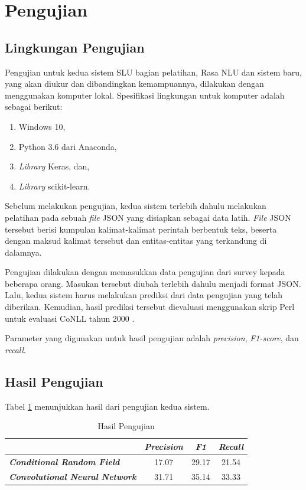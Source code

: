 \section{Pengujian}

\subsection{Lingkungan Pengujian}

Pengujian untuk kedua sistem SLU bagian pelatihan, Rasa NLU dan sistem baru, yang akan diukur dan dibandingkan kemampuannya, dilakukan dengan menggunakan komputer lokal. Spesifikasi lingkungan untuk komputer adalah sebagai berikut:

\begin{enumerate}
    \item Windows 10,
    \item Python 3.6 dari Anaconda,
    \item \textit{Library} Keras, dan,
    \item \textit{Library} scikit-learn.
\end{enumerate}

Sebelum melakukan pengujian, kedua sistem terlebih dahulu melakukan pelatihan pada sebuah \textit{file} JSON yang disiapkan sebagai data latih. \textit{File} JSON tersebut berisi kumpulan kalimat-kalimat perintah berbentuk teks, beserta dengan maksud kalimat tersebut dan entitas-entitas yang terkandung di dalamnya.

Pengujian dilakukan dengan memasukkan data pengujian dari survey kepada beberapa orang. Masukan tersebut diubah terlebih dahulu menjadi format JSON. Lalu, kedua sistem harus melakukan prediksi dari data pengujian yang telah diberikan. Kemudian, hasil prediksi tersebut dievaluasi menggunakan skrip Perl untuk evaluasi CoNLL tahun 2000 \parencite{tjong2000introduction}.

Parameter yang digunakan untuk hasil pengujian adalah \textit{precision}, \textit{F1-score}, dan \textit{recall}.

\subsection{Hasil Pengujian}

Tabel \ref{tbl:result} menunjukkan hasil dari pengujian kedua sistem.

\begin{table}[H]
    \caption{Hasil Pengujian}
    \label{tbl:result}
    \centering
    \begin{tabular}{|l|c|c|c|}
        \hline
                                                       & \textit{\textbf{Precision}} & \textit{\textbf{F1}} & \textit{\textbf{Recall}} \\ \hline
        \textit{\textbf{Conditional Random Field}}     & 17.07                       & 29.17                & 21.54                    \\ \hline
        \textit{\textbf{Convolutional Neural Network}} & 31.71                       & 35.14                & 33.33                    \\ \hline
    \end{tabular}
\end{table}